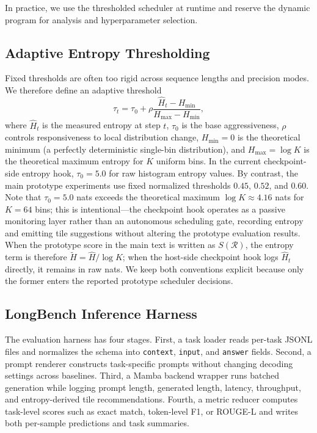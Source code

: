 In practice, we use the thresholded scheduler at runtime and reserve the dynamic program for analysis and hyperparameter selection.

\subsection{Adaptive Entropy Thresholding}
Fixed thresholds are often too rigid across sequence lengths and precision modes. We therefore define an adaptive threshold
\[
\tau_t = \tau_0 + \rho \frac{\hat{H}_t - H_{\min}}{H_{\max} - H_{\min}},
\]
where \(\hat{H}_t\) is the measured entropy at step \(t\), \(\tau_0\) is the base aggressiveness, \(\rho\) controls responsiveness to local distribution change, $H_{\min}=0$ is the theoretical minimum (a perfectly deterministic single-bin distribution), and $H_{\max}=\log K$ is the theoretical maximum entropy for $K$ uniform bins. In the current checkpoint-side entropy hook, \(\tau_0 = 5.0\) for raw histogram entropy values. By contrast, the main prototype experiments use fixed normalized thresholds \(0.45\), \(0.52\), and \(0.60\). Note that \(\tau_0 = 5.0\) nats exceeds the theoretical maximum \(\log K \approx 4.16\) nats for \(K=64\) bins; this is intentional---the checkpoint hook operates as a passive monitoring layer rather than an autonomous scheduling gate, recording entropy and emitting tile suggestions without altering the prototype evaluation results.
When the prototype score in the main text is written as \(S(\mathcal{R})\), the entropy term is therefore \(\widetilde{H}=\widehat{H}/\log K\); when the host-side checkpoint hook logs \(\hat{H}_t\) directly, it remains in raw nats. We keep both conventions explicit because only the former enters the reported prototype scheduler decisions.

\subsection{LongBench Inference Harness}
The evaluation harness has four stages. First, a task loader reads per-task JSONL files and normalizes the schema into \texttt{context}, \texttt{input}, and \texttt{answer} fields. Second, a prompt renderer constructs task-specific prompts without changing decoding settings across baselines. Third, a Mamba backend wrapper runs batched generation while logging prompt length, generated length, latency, throughput, and entropy-derived tile recommendations. Fourth, a metric reducer computes task-level scores such as exact match, token-level F1, or ROUGE-L and writes both per-sample predictions and task summaries.

